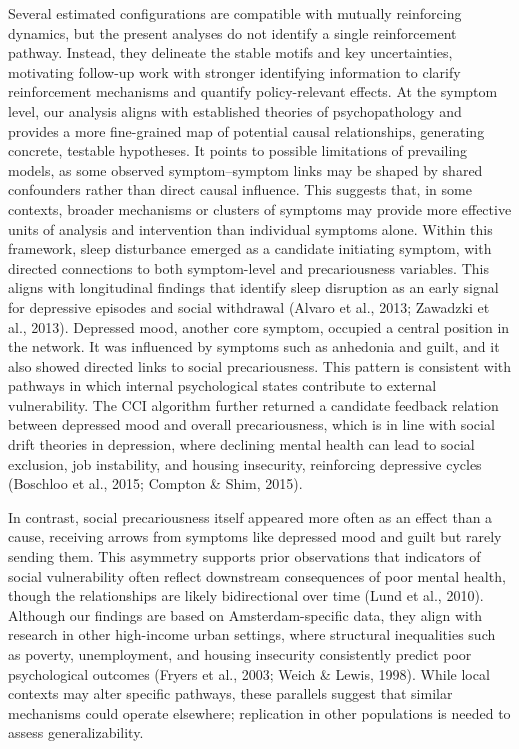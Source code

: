 \documentclass[
]{article}
\begin{document}
Several estimated configurations are compatible with mutually
reinforcing dynamics, but the present analyses do not identify a single
reinforcement pathway. Instead, they delineate the stable motifs and key
uncertainties, motivating follow-up work with stronger identifying
information to clarify reinforcement mechanisms and quantify
policy-relevant effects. At the symptom level, our analysis aligns with
established theories of psychopathology and provides a more fine-grained
map of potential causal relationships, generating concrete, testable
hypotheses. It points to possible limitations of prevailing models, as
some observed symptom--symptom links may be shaped by shared confounders
rather than direct causal influence. This suggests that, in some
contexts, broader mechanisms or clusters of symptoms may provide more
effective units of analysis and intervention than individual symptoms
alone. Within this framework, sleep disturbance emerged as a candidate
initiating symptom, with directed connections to both symptom-level and
precariousness variables. This aligns with longitudinal findings that
identify sleep disruption as an early signal for depressive episodes and
social withdrawal (Alvaro et al., 2013; Zawadzki et al., 2013).
Depressed mood, another core symptom, occupied a central position in the
network. It was influenced by symptoms such as anhedonia and guilt, and
it also showed directed links to social precariousness. This pattern is
consistent with pathways in which internal psychological states
contribute to external vulnerability. The CCI algorithm further returned
a candidate feedback relation between depressed mood and overall
precariousness, which is in line with social drift theories in
depression, where declining mental health can lead to social exclusion,
job instability, and housing insecurity, reinforcing depressive cycles
(Boschloo et al., 2015; Compton \& Shim, 2015).

In contrast, social precariousness itself appeared more often as an
effect than a cause, receiving arrows from symptoms like depressed mood
and guilt but rarely sending them. This asymmetry supports prior
observations that indicators of social vulnerability often reflect
downstream consequences of poor mental health, though the relationships
are likely bidirectional over time (Lund et al., 2010). Although our
findings are based on Amsterdam-specific data, they align with research
in other high-income urban settings, where structural inequalities such
as poverty, unemployment, and housing insecurity consistently predict
poor psychological outcomes (Fryers et al., 2003; Weich \& Lewis, 1998).
While local contexts may alter specific pathways, these parallels
suggest that similar mechanisms could operate elsewhere; replication in
other populations is needed to assess generalizability.
\end{document}
